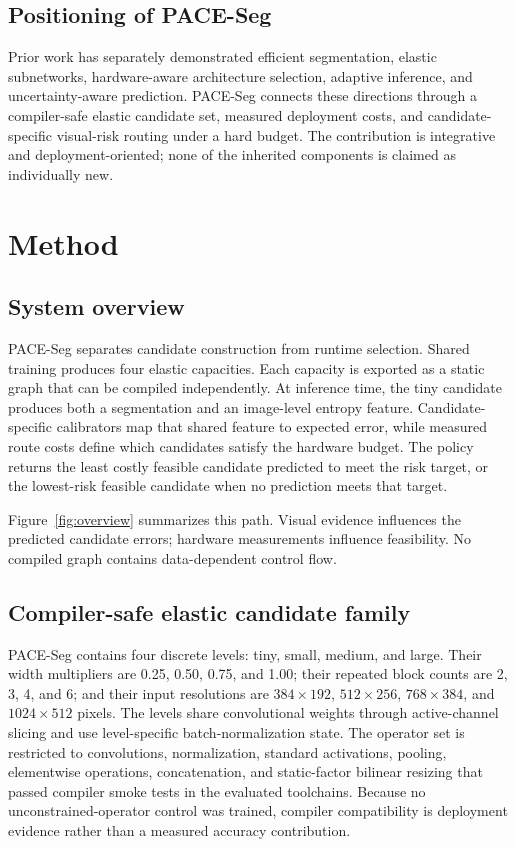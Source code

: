 \documentclass[a4paper,review,12pt]{elsarticle}
\newcommand{\method}{PACE-Seg}
\begin{document}
\subsection{Positioning of PACE-Seg}

Prior work has separately demonstrated efficient segmentation, elastic subnetworks, hardware-aware architecture selection, adaptive inference, and uncertainty-aware prediction. \method{} connects these directions through a compiler-safe elastic candidate set, measured deployment costs, and candidate-specific visual-risk routing under a hard budget. The contribution is integrative and deployment-oriented; none of the inherited components is claimed as individually new.

\section{Method}
\label{sec:method}

\subsection{System overview}
\label{sec:overview}

\method{} separates candidate construction from runtime selection. Shared training produces four elastic capacities. Each capacity is exported as a static graph that can be compiled independently. At inference time, the tiny candidate produces both a segmentation and an image-level entropy feature. Candidate-specific calibrators map that shared feature to expected error, while measured route costs define which candidates satisfy the hardware budget. The policy returns the least costly feasible candidate predicted to meet the risk target, or the lowest-risk feasible candidate when no prediction meets that target.

Figure~\ref{fig:overview} summarizes this path. Visual evidence influences the predicted candidate errors; hardware measurements influence feasibility. No compiled graph contains data-dependent control flow.



\subsection{Compiler-safe elastic candidate family}
\label{sec:elastic}

\method{} contains four discrete levels: tiny, small, medium, and large. Their width multipliers are 0.25, 0.50, 0.75, and 1.00; their repeated block counts are 2, 3, 4, and 6; and their input resolutions are $384\times192$, $512\times256$, $768\times384$, and $1024\times512$ pixels. The levels share convolutional weights through active-channel slicing and use level-specific batch-normalization state. The operator set is restricted to convolutions, normalization, standard activations, pooling, elementwise operations, concatenation, and static-factor bilinear resizing that passed compiler smoke tests in the evaluated toolchains. Because no unconstrained-operator control was trained, compiler compatibility is deployment evidence rather than a measured accuracy contribution.
\end{document}

